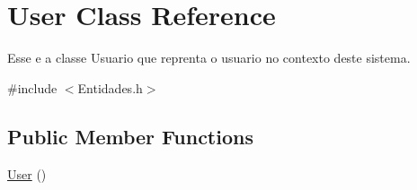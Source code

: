 \hypertarget{class_user}{\section{User Class Reference}
\label{class_user}
}


Esse e a classe Usuario que reprenta o usuario no contexto deste sistema.  




{\ttfamily \#include $<$Entidades.\-h$>$}

\subsection*{Public Member Functions}
\begin{DoxyCompactItemize}
\item 
\hypertarget{class_user_a4a0137053e591fbb79d9057dd7d2283d}{\hyperlink{class_user_a4a0137053e591fbb79d9057dd7d2283d}{User} ()}\label{class_user_a4a0137053e591fbb79d9057dd7d2283d}


\end{DoxyCompactItemize}
